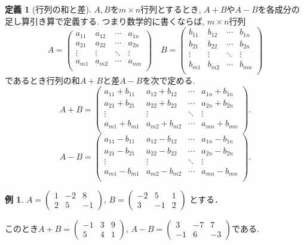 \documentclass[dvipdfmx,a4paper,11pt]{article}
\theoremstyle{definition}
\newtheorem{dfn}[thm]{定義}
\newtheorem{exa}[thm]{例}
\begin{document}
 \begin{tcolorbox}[
    colback = white,
    colframe = green!35!black,
    fonttitle = \bfseries,
    breakable = true]
    \begin{dfn}[行列の和と差]
    \text{}
 $A,B$を$m \times n$行列とするとき, $A+B$や$A-B$を各成分の足し算引き算で定義する. 
 つまり数学的に書くならば, $m \times n$行列
$$
A=\begin{pmatrix}
a_{11}& a_{12} & \cdots &a_{1n} \\
a_{21}& a_{22} & \cdots &a_{2n} \\
\vdots& \vdots	&	\ddots   &	\vdots \\
a_{m1}& a_{m2} & \cdots &a_{mn} \\
\end{pmatrix}
\quad
B=\begin{pmatrix}
b_{11}& b_{12} & \cdots &b_{1n} \\
b_{21}& b_{22} & \cdots &b_{2n} \\
\vdots& \vdots	&	\ddots   &	\vdots \\
b_{m1}& b_{m2} & \cdots &b_{mn} \\
\end{pmatrix}
$$
であるとき行列の和$A+B$と差$A-B$を次で定める.
$$
A+B=
\begin{pmatrix}
a_{11}+b_{11}& a_{12}+b_{12}& \cdots &a_{1n} +b_{1n}\\
a_{21}+b_{21}& a_{22}+b_{22}& \cdots &a_{2n}+b_{2n} \\
\vdots& \vdots	&	\ddots   &	\vdots \\
a_{m1}+b_{m1}& a_{m2} +b_{m2}& \cdots &a_{mn} +b_{mn}\\
\end{pmatrix}.
$$
$$
A-B=
\begin{pmatrix}
a_{11}-b_{11}& a_{12}-b_{12}& \cdots &a_{1n} -b_{1n}\\
a_{21}-b_{21}& a_{22}-b_{22}& \cdots &a_{2n}-b_{2n} \\
\vdots& \vdots	&	\ddots   &	\vdots \\
a_{m1}-b_{m1}& a_{m2}-b_{m2}& \cdots &a_{mn}-b_{mn}\\
\end{pmatrix}.
$$
  \end{dfn}
 \end{tcolorbox}
 
 \begin{exa}
 $A = 
 \begin{pmatrix}
 1 &-2&8 \\
 2&5&-1
 \end{pmatrix}
 $, 
 $
 B = 
 \begin{pmatrix}
 -2&5&1 \\
 3&-1&2
 \end{pmatrix}
 $
 とする．
 
 このとき$
 A+B =
 \begin{pmatrix}
 -1 &3&9 \\
 5&4&1
 \end{pmatrix}
 $, 
 $
  A-B =
 \begin{pmatrix}
 3 &-7&7 \\
 -1&6&-3
 \end{pmatrix}
 $である.
 \end{exa}
\end{document}
